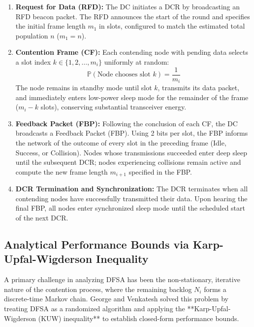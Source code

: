 \begin{enumerate}
    \item \textbf{Request for Data (RFD):} The DC initiates a DCR by broadcasting an RFD beacon packet. The RFD announces the start of the round and specifies the initial frame length $m_1$ in slots, configured to match the estimated total population $n$ ($m_1 = n$).
    \item \textbf{Contention Frame (CF):} Each contending node with pending data selects a slot index $k \in \{1, 2, \dots, m_i\}$ uniformly at random:
    \begin{equation}
        \mathbb{P}(\text{Node chooses slot } k) = \frac{1}{m_i}
    \end{equation}
    The node remains in standby mode until slot $k$, transmits its data packet, and immediately enters low-power sleep mode for the remainder of the frame ($m_i - k$ slots), conserving substantial transceiver energy.
    \item \textbf{Feedback Packet (FBP):} Following the conclusion of each CF, the DC broadcasts a Feedback Packet (FBP). Using 2 bits per slot, the FBP informs the network of the outcome of every slot in the preceding frame (Idle, Success, or Collision). Nodes whose transmissions succeeded enter deep sleep until the subsequent DCR; nodes experiencing collisions remain active and compute the new frame length $m_{i+1}$ specified in the FBP.
    \item \textbf{DCR Termination and Synchronization:} The DCR terminates when all contending nodes have successfully transmitted their data. Upon hearing the final FBP, all nodes enter synchronized sleep mode until the scheduled start of the next DCR.
\end{enumerate}

\subsection{Analytical Performance Bounds via Karp-Upfal-Wigderson Inequality}
A primary challenge in analyzing DFSA has been the non-stationary, iterative nature of the contention process, where the remaining backlog $N_i$ forms a discrete-time Markov chain. George and Venkatesh \cite{george2018performance} solved this problem by treating DFSA as a randomized algorithm and applying the **Karp-Upfal-Wigderson (KUW) inequality** to establish closed-form performance bounds.


